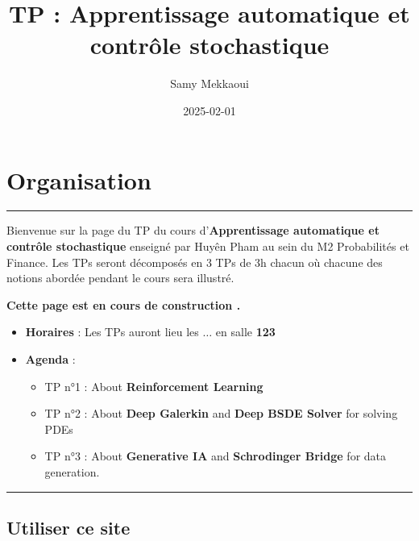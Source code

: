 \documentclass[
  10,
  letterpaper,
  DIV=11,
  numbers=noendperiod]{scrreport}
\title{TP : Apprentissage automatique et contrôle stochastique}
\author{Samy Mekkaoui}
\date{2025-02-01}
\providecommand{\tightlist}{%
  \setlength{\itemsep}{0pt}\setlength{\parskip}{0pt}}\usepackage{longtable,booktabs,array}
\renewcommand*\contentsname{Table des matières}
\newcommand\contentsname{Table des matières}
\theoremstyle{definition}
\theoremstyle{definition}
\theoremstyle{plain}
\theoremstyle{remark}
\begin{document}
\maketitle

\renewcommand*\contentsname{Table des matières}
{
\hypersetup{linkcolor=}
\setcounter{tocdepth}{2}
\tableofcontents
}


\chapter*{Organisation}\label{organisation}


\begin{center}\rule{0.5\linewidth}{0.5pt}\end{center}

Bienvenue sur la page du TP du cours d'\textbf{Apprentissage automatique
et contrôle stochastique} enseigné par Huyên Pham au sein du M2
Probabilités et Finance. Les TPs seront décomposés en 3 TPs de 3h chacun
où chacune des notions abordée pendant le cours sera illustré.

\textbf{Cette page est en cours de construction .}

\begin{itemize}
\item
  \textbf{Horaires} : Les TPs auront lieu les \(\ldots\) en salle
  \textbf{123}
\item
  \textbf{Agenda} :

  \begin{itemize}
  \tightlist
  \item
    TP n°1 : About \textbf{Reinforcement Learning}
  \item
    TP n°2 : About \textbf{Deep Galerkin} and \textbf{Deep BSDE Solver}
    for solving PDEs
  \item
    TP n°3 : About \textbf{Generative IA} and \textbf{Schrodinger
    Bridge} for data generation.
  \end{itemize}
\end{itemize}

\begin{center}\rule{0.5\linewidth}{0.5pt}\end{center}

\section*{Utiliser ce site}\label{utiliser-ce-site}
\end{document}
